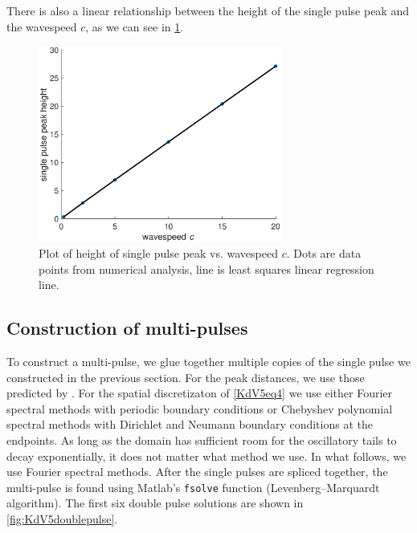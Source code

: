 \documentclass[thesis2.tex]{subfiles}
\begin{document}
There is also a linear relationship between the height of the single pulse peak and the wavespeed $c$, as we can see in \cref{fig:KdV5peakht}.

\begin{figure}
\begin{center}
\includegraphics[width=8cm]{images/kdv5numerics/peakheightvsc}
\caption[Solitary wave amplitude vs. wavespeed for KdV5]{Plot of height of single pulse peak vs. wavespeed $c$. Dots are data points from numerical analysis, line is least squares linear regression line.}
\label{fig:KdV5peakht}
\end{center}
\end{figure}

\subsection{Construction of multi-pulses}\label{sec:kdv5nummulti}

To construct a multi-pulse, we glue together multiple copies of the single pulse we constructed in the previous section. For the peak distances, we use those predicted by \cite{SandstedeStrut}. For the spatial discretizaton of \eqref{KdV5eq4} we use either Fourier spectral methods with periodic boundary conditions or Chebyshev polynomial spectral methods with Dirichlet and Neumann boundary conditions at the endpoints. As long as the domain has sufficient room for the oscillatory tails to decay exponentially, it does not matter what method we use. In what follows, we use Fourier spectral methods. After the single pulses are spliced together, the multi-pulse is found using Matlab's \texttt{fsolve} function (Levenberg–Marquardt algorithm). The first six double pulse solutions are shown in \cref{fig:KdV5doublepulse}.
\end{document}
